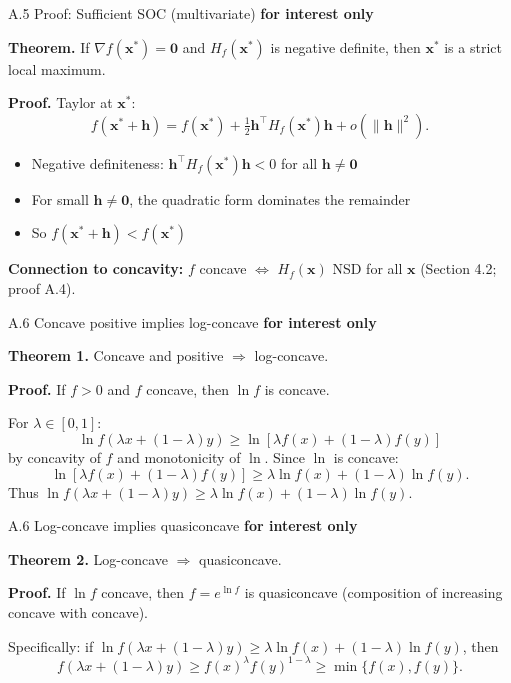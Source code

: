 \documentclass[11pt,aspectratio=169]{beamer}
\newcommand{\InterestOnly}{\textcolor{mAccent}{\textbf{for interest only}}}
\begin{document}
\begin{frame}{A.5 Proof: Sufficient SOC (multivariate)}
  \small
  \InterestOnly
  
  \textbf{Theorem.} If $\nabla f(\mathbf{x}^*)=\mathbf{0}$ and $H_f(\mathbf{x}^*)$ is negative definite, then $\mathbf{x}^*$ is a strict local maximum.
  
  \textbf{Proof.} Taylor at $\mathbf{x}^*$:
  \[
    f(\mathbf{x}^* + \mathbf{h})
    =
    f(\mathbf{x}^*) + \tfrac12 \mathbf{h}^\top H_f(\mathbf{x}^*)\mathbf{h} + o(\|\mathbf{h}\|^2).
  \]
  
  \begin{itemize}
    \item Negative definiteness: $\mathbf{h}^\top H_f(\mathbf{x}^*)\mathbf{h} < 0$ for all $\mathbf{h} \neq \mathbf{0}$
    
    \item For small $\mathbf{h} \neq \mathbf{0}$, the quadratic form dominates the remainder
    
    \item So $f(\mathbf{x}^* + \mathbf{h}) < f(\mathbf{x}^*)$
  \end{itemize}
  
  \textbf{Connection to concavity:} $f$ concave $\Leftrightarrow$ $H_f(\mathbf{x})$ NSD for all $\mathbf{x}$ (Section 4.2; proof A.4).
\end{frame}

\hypertarget{appendix:logconcave}{}
\begin{frame}{A.6 Concave positive implies log-concave}
  \small
  \InterestOnly
  
  \textbf{Theorem 1.} Concave and positive $\Rightarrow$ log-concave.
  
  \textbf{Proof.} If $f > 0$ and $f$ concave, then $\ln f$ is concave.
  
  For $\lambda \in [0,1]$:
  \[
    \ln f(\lambda x + (1-\lambda)y) \geq \ln\left[\lambda f(x) + (1-\lambda)f(y)\right]
  \]
  by concavity of $f$ and monotonicity of $\ln$. Since $\ln$ is concave:
  \[
    \ln\left[\lambda f(x) + (1-\lambda)f(y)\right] \geq \lambda \ln f(x) + (1-\lambda) \ln f(y).
  \]
  Thus $\ln f(\lambda x + (1-\lambda)y) \geq \lambda \ln f(x) + (1-\lambda) \ln f(y)$.
\end{frame}

\begin{frame}{A.6 Log-concave implies quasiconcave}
  \small
  \InterestOnly

  \textbf{Theorem 2.} Log-concave $\Rightarrow$ quasiconcave.
  
  \textbf{Proof.} If $\ln f$ concave, then $f = e^{\ln f}$ is quasiconcave (composition of increasing concave with concave).
  
  Specifically: if $\ln f(\lambda x + (1-\lambda)y) \geq \lambda \ln f(x) + (1-\lambda) \ln f(y)$, then
  \[
    f(\lambda x + (1-\lambda)y) \geq f(x)^\lambda f(y)^{1-\lambda} \geq \min\{f(x), f(y)\}.
  \]
\end{frame}
\end{document}
